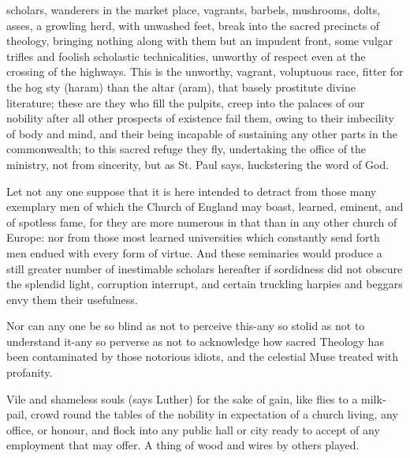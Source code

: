 scholars, wanderers in the market place, vagrants, barbels, mushrooms, dolts,
asses, a growling herd, with unwashed feet, break into the sacred precincts of
theology, bringing nothing along with them but an impudent front, some vulgar
trifles and foolish scholastic technicalities, unworthy of respect even at the
crossing of the highways. This is the unworthy, vagrant, voluptuous race,
fitter for the hog sty (haram) than the altar (aram), that basely prostitute
divine literature; these are they who fill the pulpits, creep into the palaces
of our nobility after all other prospects of existence fail them, owing to
their imbecility of body and mind, and their being incapable of sustaining any
other parts in the commonwealth; to this sacred refuge they fly, undertaking
the office of the ministry, not from sincerity, but as St. Paul says,
huckstering the word of God.

Let not any one suppose that it is here intended to detract from those many
exemplary men of which the Church of England may boast, learned, eminent, and
of spotless fame, for they are more numerous in that than in any other church
of Europe: nor from those most learned universities which constantly send forth
men endued with every form of virtue. And these seminaries would produce a
still greater number of inestimable scholars hereafter if sordidness did not
obscure the splendid light, corruption interrupt, and certain truckling harpies
and beggars envy them their usefulness.

Nor can any one be so blind as not to perceive this-any so stolid as not to
understand it-any so perverse as not to acknowledge how sacred Theology has
been contaminated by those notorious idiots, and the celestial Muse treated
with profanity.

Vile and shameless souls (says Luther) for the sake of gain, like flies to a
milk-pail, crowd round the tables of the nobility in expectation of a church
living, any office, or honour, and flock into any public hall or city ready to
accept of any employment that may offer. A thing of wood and wires by others
played.

